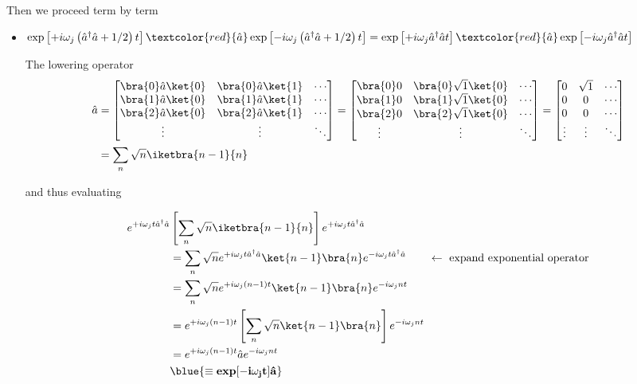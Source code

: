 \noindent Then we proceed term by term
\begin{itemize}
	\item $\exp\left[+i\omega_j\left(\hat{a}^\dagger\hat{a}+{1}/{2}\right)t\right]\textcolor{red}{\hat{a}}\exp\left[-i\omega_j\left(\hat{a}^\dagger\hat{a}+{1}/{2}\right)t\right] = \exp\left[+i\omega_j\hat{a}^\dagger\hat{a}t\right]\textcolor{red}{\hat{a}}\exp\left[-i\omega_j\hat{a}^\dagger\hat{a}t\right]$
	
	The lowering operator \textcolor{red}{
		\begin{equation}
		\begin{aligned}
		\hat{a} & =
		\begin{bmatrix}
		\bra{0}\hat{a}\ket{0} & \bra{0}\hat{a}\ket{1} & \cdots\\
		\bra{1}\hat{a}\ket{0} & \bra{1}\hat{a}\ket{1} & \cdots\\
		\bra{2}\hat{a}\ket{0} & \bra{2}\hat{a}\ket{1} & \cdots\\
		\vdots & \vdots & \ddots\\
		\end{bmatrix}
		= \begin{bmatrix}
		\bra{0}0 & \bra{0}\sqrt{1}\ket{0} & \cdots\\
		\bra{1}0 & \bra{1}\sqrt{1}\ket{0} & \cdots\\
		\bra{2}0 & \bra{2}\sqrt{1}\ket{0} & \cdots\\
		\vdots & \vdots & \ddots\\	
		\end{bmatrix}
		= \begin{bmatrix}
		0 & \sqrt{1} & \cdots\\
		0 & 0 & \cdots\\
		0 & 0 & \cdots\\
		\vdots & \vdots & \ddots\\	
		\end{bmatrix}\\
		& = \sum_n\sqrt{n}\iketbra{n-1}{n}
		\end{aligned}
		\end{equation}}
	
	\noindent and thus evaluating
	
	\begin{equation}
	\begin{aligned}
	e^{+i\omega_jt\hat{a}^\dagger\hat a} & \left[\sum_n\sqrt{n}\iketbra{n-1}{n}\right]e^{+i\omega_jt\hat{a}^\dagger\hat a}\\
	& = \sum_n \sqrt{n}e^{+i\omega_jt\hat{a}^\dagger\hat a}\ket{n-1}\bra{n}e^{-i\omega_jt\hat{a}^\dagger\hat a} \qquad \leftarrow\text{ expand exponential operator}\\
	& = \sum_n \sqrt{n}e^{+i\omega_j(n-1)t}\ket{n-1}\bra{n}e^{-i\omega_jnt}\\
	& = e^{+i\omega_j(n-1)t}\left[\sum_n \sqrt{n}\ket{n-1}\bra{n}\right]e^{-i\omega_jnt}\\
	& = e^{+i\omega_j(n-1)t}\hat{a}e^{-i\omega_jnt}\\ & \blue{\mathbf{\equiv  \text{\textbf{exp}}[-i\omega_jt]\hat{a}}}
	\end{aligned}
	\end{equation}
	

\end{itemize}
